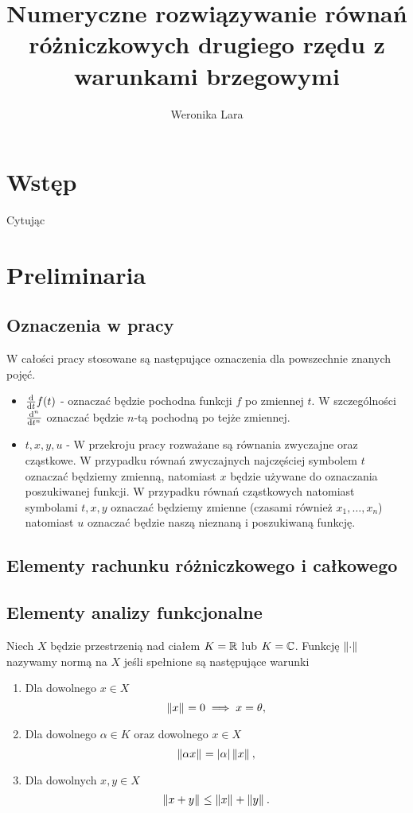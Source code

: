 \documentclass[12pt,a4paper]{report}
\author{Weronika Lara}
\title{Numeryczne rozwiązywanie równań różniczkowych drugiego rzędu z warunkami brzegowymi}
\begin{document}
\maketitle

\chapter{Wstęp}

Cytując \citep[Rozdział 3, sekcja 2]{palczewski2004rownania}

\chapter{Preliminaria}

\section{Oznaczenia w pracy}

W całości pracy stosowane są następujące oznaczenia dla powszechnie znanych pojęć.
\begin{itemize}
\item $\ddx{t} f(t)$ - oznaczać będzie pochodna funkcji $f$ po zmiennej $t$. W szczególności $\ddx[^n]{t^n}$ oznaczać będzie $n$-tą pochodną po tejże zmiennej.
\item $t, x, y, u$ - W przekroju pracy rozważane są równania zwyczajne oraz cząstkowe. W przypadku równań zwyczajnych najczęściej symbolem $t$ oznaczać będziemy zmienną, natomiast $x$ będzie używane do oznaczania poszukiwanej funkcji. W przypadku równań cząstkowych natomiast symbolami $t,x,y$ oznaczać będziemy zmienne (czasami również $x_1,\ldots,x_n$) natomiast $u$ oznaczać będzie naszą nieznaną i poszukiwaną funkcję.
\end{itemize}

\section{Elementy rachunku różniczkowego i całkowego}


\section{Elementy analizy funkcjonalne}



\begin{definition}
Niech $X$ będzie przestrzenią nad ciałem $K =\setR $ lub $ K = \setC $. Funkcję $\norm{\cdot}$ nazywamy normą na $X$ jeśli spełnione są następujące warunki 
\begin{enumerate}
\item Dla dowolnego $x\in X$
$$
 \norm{x} = 0 \implies x = \theta,
$$
\item Dla dowolnego $\alpha \in K$ oraz dowolnego $x \in X$ 
$$
\norm{\alpha x}  = \abs{\alpha}  \norm{x},
$$
\item Dla dowolnych $x,y\in X$
$$
 \norm{x+y} \leq \norm{x} + \norm{y}.
$$
\end{enumerate}

\end{definition}
\end{document}
